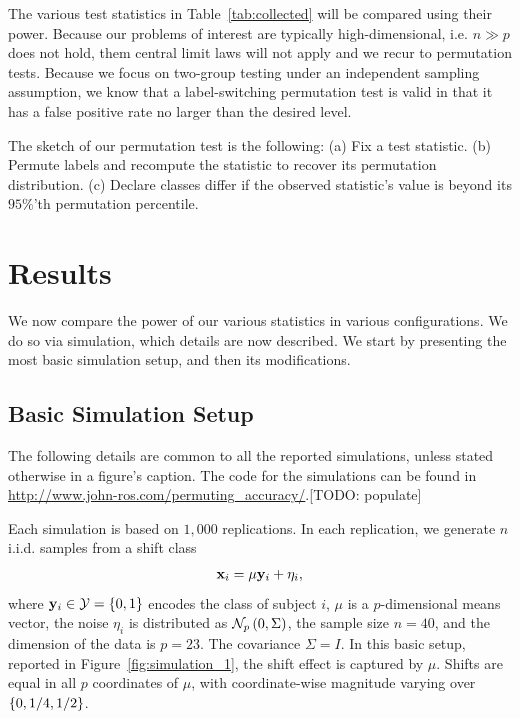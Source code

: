\documentclass[12pt,a4paper]{article}
\begin{document}
The various test statistics in Table~\ref{tab:collected} will be compared using their power. 
Because our problems of interest are typically high-dimensional, i.e. $n \gg p$ does not hold, them central limit laws will not apply and we recur to permutation tests.
Because we focus on two-group testing under an independent sampling assumption, we know that a label-switching permutation test is valid in that it has a false positive rate no larger than the desired level. 

The sketch of our permutation test is the following: 
(a) Fix a test statistic.
(b) Permute labels and recompute the statistic to recover its permutation distribution. 
(c) Declare classes differ if the observed statistic's value is beyond its $95\%$'th permutation percentile.  





\section{Results}
\label{sec:results}
We now compare the power of our various statistics in various configurations. 
We do so via simulation, which details are now described.
We start by presenting the most basic simulation setup, and then its modifications. 


\subsection{Basic Simulation Setup}
\label{sec:simulation_details}

The following details are common to all the reported simulations, unless stated otherwise in a figure's caption. 
The \R code for the simulations can be found in \url{http://www.john-ros.com/permuting_accuracy/}.[TODO: populate]

Each simulation is based on $1,000$ replications. 
In each replication, we generate $n$ i.i.d. samples from a shift class 
\begin{align}
\label{eq:distribution}
	\mathbf{x}_i = \mu \mathbf{y}_i + \eta_i,
\end{align}
where $\mathbf{y}_i \in \mathcal{Y}=\{ 0,1 \}$ encodes the class of subject $i$, $\mu$ is a $p$-dimensional means vector, the noise $\eta_i$ is distributed as $\mathcal{N}_{p}\left(0,\Sigma\right)$, the sample size $n=40$, and the dimension of the data is $p=23$. 
The covariance $\Sigma=I$. 
In this basic setup, reported in Figure~\ref{fig:simulation_1}, the shift effect is captured by $\mu$. 
Shifts are equal in all $p$ coordinates of $\mu$, with coordinate-wise magnitude varying over $\{ 0,1/4,1/2 \}$.
\end{document}
